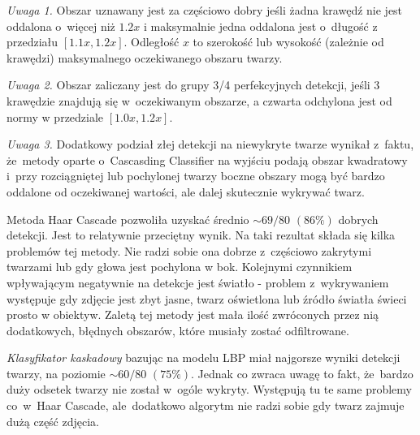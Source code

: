 \textit{Uwaga 1.}\label{uwaga:czesciowo_dobry} Obszar uznawany jest za częściowo dobry jeśli żadna krawędź nie jest oddalona o~więcej niż $1.2x$ i maksymalnie jedna oddalona jest o~długość z przedziału $[1.1x, 1.2x]$. Odległość $x$ to szerokość lub wysokość (zależnie od krawędzi) maksymalnego oczekiwanego obszaru twarzy.

\par

\textit{Uwaga 2.}\label{uwaga:3_4_perfekcyjny} Obszar zaliczany jest do grupy 3/4 perfekcyjnych detekcji, jeśli 3 krawędzie znajdują się w~oczekiwanym obszarze, a czwarta odchylona jest od normy w przedziale $[1.0x, 1.2x]$.

\par 

\textit{Uwaga 3.}\label{uwaga:dodatkowy_zle} Dodatkowy podział złej detekcji na niewykryte twarze wynikał z~faktu, że~metody oparte o~Cascasding Classifier na wyjściu podają obszar kwadratowy i~przy rozciągniętej lub pochylonej twarzy boczne obszary mogą być bardzo oddalone od oczekiwanej wartości, ale dalej skutecznie wykrywać twarz. 

\vspace{10mm}




Metoda Haar Cascade pozwoliła uzyskać średnio $\sim69/80$ $(86\%)$ dobrych detekcji. Jest to relatywnie przeciętny wynik. Na taki rezultat składa się kilka problemów tej metody. Nie radzi sobie ona dobrze z~częściowo zakrytymi twarzami lub gdy głowa jest pochylona w bok. Kolejnymi czynnikiem wpływającym negatywnie na detekcje jest światło - problem z~wykrywaniem występuje gdy zdjęcie jest zbyt jasne, twarz oświetlona lub źródło światła świeci prosto w obiektyw. Zaletą tej metody jest mała ilość zwróconych przez nią dodatkowych, błędnych obszarów, które musiały zostać odfiltrowane.

\par

\textit{Klasyfikator kaskadowy} bazując na modelu LBP miał najgorsze wyniki detekcji twarzy, na poziomie $\sim60/80$ $(75 \%)$. Jednak co zwraca uwagę to fakt, że~bardzo duży odsetek twarzy nie został w~ogóle wykryty. Występują tu te same problemy co~w~Haar Cascade, ale~dodatkowo algorytm nie radzi sobie gdy twarz zajmuje dużą część zdjęcia.

\par

